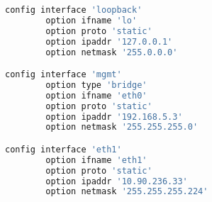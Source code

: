 \begin{lstlisting}[language=bash, caption={Network}]
config interface 'loopback'
        option ifname 'lo'
        option proto 'static'
        option ipaddr '127.0.0.1'
        option netmask '255.0.0.0'

config interface 'mgmt'
        option type 'bridge'
        option ifname 'eth0'
        option proto 'static'
        option ipaddr '192.168.5.3'
        option netmask '255.255.255.0'

config interface 'eth1'
        option ifname 'eth1'
        option proto 'static'
        option ipaddr '10.90.236.33'
        option netmask '255.255.255.224'
\end{lstlisting}